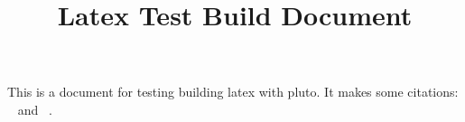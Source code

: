 \documentclass[11pt]{article}
\begin{document}
\title{Latex Test Build Document}

\maketitle


This is a document for testing building latex with pluto. It makes some citations:
~\cite{article1} and ~\cite{misc1}.



\end{document}
